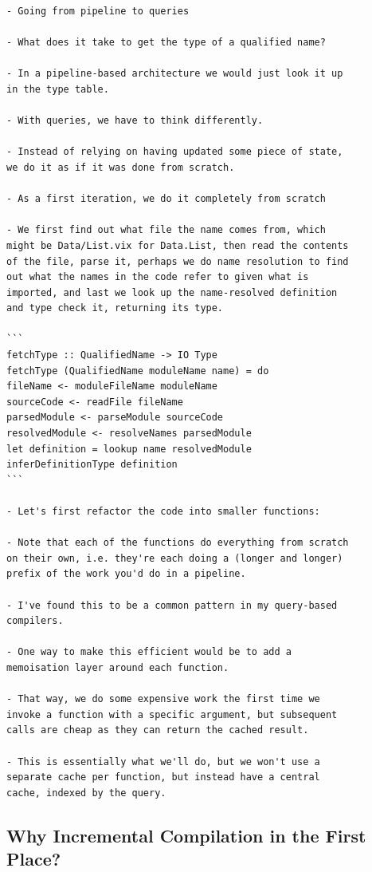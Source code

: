 \documentclass[12pt, a4paper]{report}
\begin{document}
\begin{verbatim}
- Going from pipeline to queries

- What does it take to get the type of a qualified name?

- In a pipeline-based architecture we would just look it up
in the type table.

- With queries, we have to think differently.

- Instead of relying on having updated some piece of state,
we do it as if it was done from scratch.

- As a first iteration, we do it completely from scratch

- We first find out what file the name comes from, which
might be Data/List.vix for Data.List, then read the contents
of the file, parse it, perhaps we do name resolution to find
out what the names in the code refer to given what is
imported, and last we look up the name-resolved definition
and type check it, returning its type.

```
fetchType :: QualifiedName -> IO Type
fetchType (QualifiedName moduleName name) = do
fileName <- moduleFileName moduleName
sourceCode <- readFile fileName
parsedModule <- parseModule sourceCode
resolvedModule <- resolveNames parsedModule
let definition = lookup name resolvedModule
inferDefinitionType definition
```

- Let's first refactor the code into smaller functions:

- Note that each of the functions do everything from scratch
on their own, i.e. they're each doing a (longer and longer)
prefix of the work you'd do in a pipeline.

- I've found this to be a common pattern in my query-based
compilers.

- One way to make this efficient would be to add a
memoisation layer around each function.

- That way, we do some expensive work the first time we
invoke a function with a specific argument, but subsequent
calls are cheap as they can return the cached result.

- This is essentially what we'll do, but we won't use a
separate cache per function, but instead have a central
cache, indexed by the query.
\end{verbatim}
\cite{olle_query_based}

\subsection*{Why Incremental Compilation in the First Place? \cite{rust_blog_incremental_compilation}}
\end{document}
